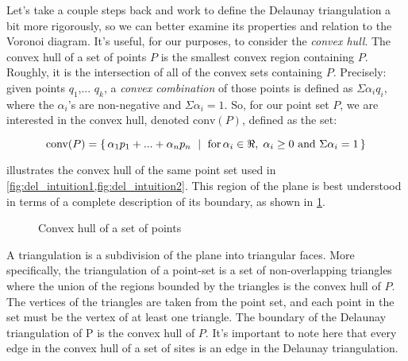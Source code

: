 \documentclass[12pt,twoside]{reedthesis}
\begin{document}
    Let's take a couple steps back and work to define the Delaunay triangulation a bit more rigorously, so we can better examine its properties and relation to the Voronoi diagram. It's useful, for our purposes, to consider the \emph{convex hull}. The convex hull of a set of points $P$ is the smallest convex region containing $P$. Roughly, it is the intersection of all of the convex sets containing $P$. Precisely: given points $q_{1}$,... $q_{k}$, a \emph{convex combination} of those points is defined as $\Sigma\alpha_{i}q_{i}$, where the $\alpha_{i}$'s are non-negative and $\Sigma\alpha_{i}=1.$  So, for our point set $P$, we are interested in the convex hull, denoted $\mbox{conv}(P)$, defined as the set:

    $$
     \mbox{conv}(P) = \{\, \alpha_{1}p_{1} + ... + \alpha_{n}p_{n} \ \mid\ \text{for$ \,\alpha_{i} \in \Re, \; \alpha_{i} \geq 0$ and $\Sigma\alpha_{i} = 1$}\,\} 
    $$

     illustrates the convex hull of the same point set used in \cref{fig:del_intuition1,fig:del_intuition2}. 
    This region of the plane is best understood in terms of a complete description of its boundary, as shown in \cref{fig:convex_hull}.\par

    \begin{figure}[!htb]
      \centering
      
      \caption{Convex hull of a set of points}
      \label{fig:convex_hull}
    \end{figure}

    A triangulation is a subdivision of the plane into triangular faces. More specifically, the triangulation of a point-set is a set of non-overlapping triangles where the union of the regions bounded by the triangles is the convex hull of $P$. The vertices of the triangles are taken from the point set, and each point in the set must be the vertex of at least one triangle. The boundary of the Delaunay triangulation of P is the convex hull of $P$. It's important to note here that every edge in the convex hull of a set of sites is an edge in the Delaunay triangulation.\par
\end{document}
